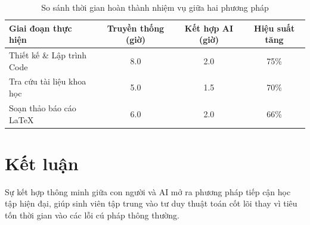\documentclass[11pt,a4paper]{article}
\begin{document}
\begin{table}[htbp]
  \centering
  \caption{So sánh thời gian hoàn thành nhiệm vụ giữa hai phương pháp}
    \begin{tabular}{lccc}
    \toprule
    \textbf{Giai đoạn thực hiện} & \textbf{Truyền thống (giờ)} & \textbf{Kết hợp AI (giờ)} & \textbf{Hiệu suất tăng} \\
    \midrule
    Thiết kế \& Lập trình Code & 8.0 & 2.0 & 75\% \\
    Tra cứu tài liệu khoa học   & 5.0 & 1.5 & 70\% \\
    Soạn thảo báo cáo \LaTeX{} & 6.0 & 2.0 & 66\% \\
    \bottomrule
    \end{tabular}
  \label{tab:performance}
\end{table}

\section{Kết luận}
Sự kết hợp thông minh giữa con người và AI mở ra phương pháp tiếp cận học tập hiện đại, giúp sinh viên tập trung vào tư duy thuật toán cốt lõi thay vì tiêu tốn thời gian vào các lỗi cú pháp thông thường.
\end{document}
